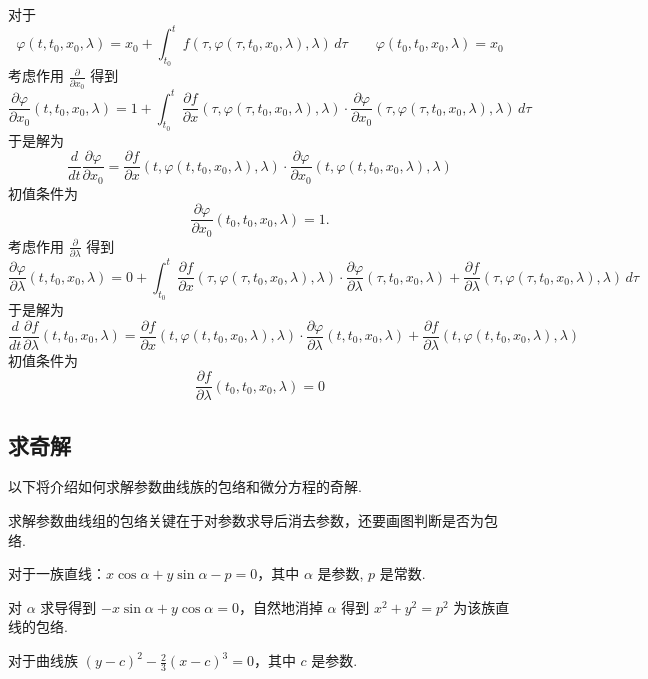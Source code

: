 对于
$$
    \varphi(t,t_{0},x_{0},\lambda)=x_{0}+\int_{t_{0}}^{t} f(\tau,\varphi(\tau,t_{0},x_{0},\lambda),\lambda) \, d\tau \qquad \varphi(t_{0},t_{0},x_{0},\lambda)=x_{0}
$$
考虑作用 $\displaystyle \frac{ \partial   }{ \partial x_{0} }$ 得到
$$
    \frac{ \partial \varphi }{ \partial x_{0} } (t,t_{0},x_{0},\lambda)=1+\int_{t_{0}}^{t} \frac{ \partial f }{ \partial x } (\tau,\varphi(\tau,t_{0},x_{0},\lambda),\lambda)\cdot \frac{ \partial \varphi }{ \partial x_{0} } (\tau,\varphi(\tau,t_{0},x_{0},\lambda),\lambda) \, d\tau
$$
于是解为
$$
    \frac{d}{dt}\frac{ \partial \varphi }{ \partial x_{0} } =\frac{ \partial f }{ \partial x } (t,\varphi(t,t_{0},x_{0},\lambda),\lambda)\cdot \frac{ \partial \varphi }{ \partial x_{0} } (t,\varphi(t,t_{0},x_{0},\lambda),\lambda)
$$
初值条件为
$$
    \frac{ \partial \varphi }{ \partial x_{0} } (t_{0},t_{0},x_{0},\lambda)=1.
$$
考虑作用 $\displaystyle \frac{ \partial   }{ \partial \lambda }$ 得到
{\small $$
    \frac{ \partial \varphi }{ \partial \lambda } (t,t_{0},x_{0},\lambda)=0+\int_{t_{0}}^{t} \frac{ \partial f }{ \partial x } (\tau,\varphi(\tau,t_{0},x_{0},\lambda),\lambda)\cdot \frac{ \partial \varphi }{ \partial \lambda } (\tau,t_{0},x_{0},\lambda)+\frac{ \partial f }{ \partial \lambda } (\tau,\varphi(\tau,t_{0},x_{0},\lambda),\lambda) \, d\tau
$$}
于是解为
$$
    \frac{d}{dt}\frac{ \partial f }{ \partial \lambda } (t,t_{0},x_{0},\lambda)=\frac{ \partial f }{ \partial x } (t,\varphi(t,t_{0},x_{0},\lambda),\lambda)\cdot \frac{ \partial \varphi }{ \partial \lambda } (t,t_{0},x_{0},\lambda)+\frac{ \partial f }{ \partial \lambda } (t,\varphi(t,t_{0},x_{0},\lambda),\lambda)
$$
初值条件为
$$
    \frac{ \partial f }{ \partial \lambda } (t_{0},t_{0},x_{0},\lambda)=0
$$

\subsection{求奇解}

以下将介绍如何求解参数曲线族的包络和微分方程的奇解.

求解参数曲线组的包络关键在于对参数求导后消去参数，还要画图判断是否为包络.

对于一族直线：$\displaystyle x\cos\alpha+y\sin\alpha-p=0$，其中 $\displaystyle \alpha$ 是参数, $p$ 是常数.

对 $\displaystyle \alpha$ 求导得到 $\displaystyle -x\sin\alpha+y\cos\alpha=0$，自然地消掉 $\displaystyle \alpha$ 得到 $\displaystyle x^{2}+y^{2}=p^{2}$ 为该族直线的包络.

对于曲线族 $\displaystyle (y-c)^{2}-\frac{2}{3}(x-c)^{3}=0$，其中 $c$ 是参数.

